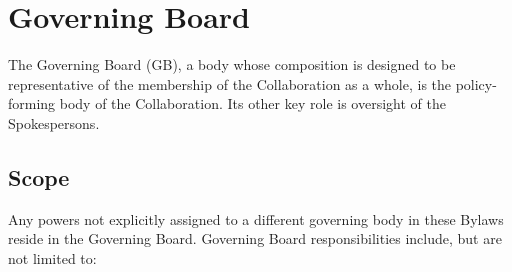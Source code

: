 \documentclass[12pt]{article}
\begin{document}
\section{Governing Board}

The Governing Board (GB), a body whose composition is designed to be representative of the membership of the Collaboration as a whole, is the policy-forming body of the Collaboration.  Its other key role is oversight of the Spokespersons.

\subsection{Scope}

Any powers not explicitly assigned to a different governing body in these Bylaws reside in the Governing Board. Governing Board responsibilities include, but are not limited to: 
\end{document}

